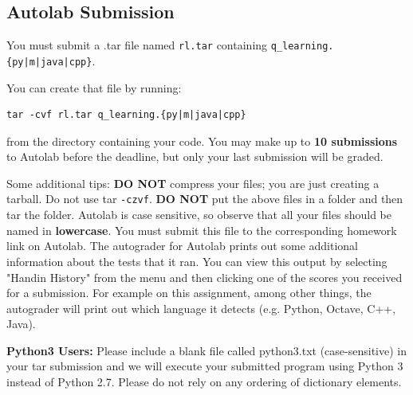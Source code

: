 \documentclass[11pt]{article}
\numberwithin{equation}{section} %
\numberwithin{figure}{section} %
\numberwithin{table}{section} %
\begin{document}
\subsection{Autolab Submission}
You must submit a .tar file 
named \texttt{rl.tar} containing \texttt{q\_learning.\{py|m|java|cpp\}}.  

You can create that file by running:
\begin{lstlisting}
tar -cvf rl.tar q_learning.{py|m|java|cpp}
\end{lstlisting}
from the directory containing your code. You may make up to \textbf{10 submissions} to Autolab before the deadline, but only your last submission will be graded.

Some additional tips: {\bf DO NOT} compress your files; you are just
creating a tarball. Do not use tar \texttt{-czvf}.  {\bf DO NOT} put
the above files in a folder and then tar the folder.  Autolab is case
sensitive, so observe that all your files should be named in {\bf
  lowercase}. You must submit this file to the corresponding homework
link on Autolab. The autograder for Autolab prints out some additional 
information about the tests that it ran. You can view this output by selecting 
 "Handin History" from the menu and then clicking one of the scores you 
 received for a submission. For example on this assignment, among other things, 
 the autograder will print out which language it detects (e.g. Python, Octave, C++, Java). 
 
 \begin{notebox}
  {\bf Python3 Users:} Please include a blank file called python3.txt (case-sensitive) in your tar submission and we will execute your submitted program using Python 3 instead of Python 2.7. Please do not rely on any ordering of dictionary elements.
 \end{notebox}

\end{document}
